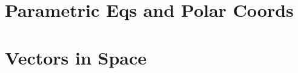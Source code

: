 \documentclass[12pt, oneside]{book}
\begin{document}
\fancyhead[R]{\leftmark}




\chapter{Parametric Eqs and Polar Coords}\label{para eqs and polar coords}
\vspace*{-0.25in}

\setcounter{chapter}{1}

\chapter{Vectors in Space}\label{vectors}
\vspace*{-0.25in}

\setcounter{chapter}{2}




\end{document}
